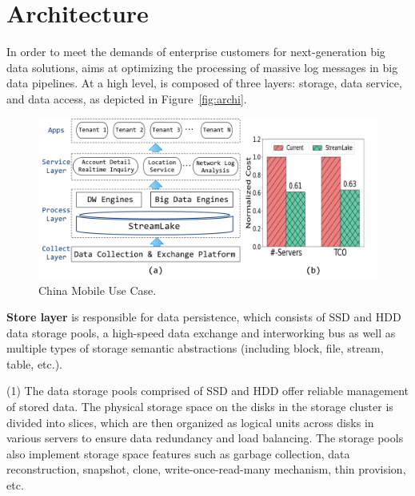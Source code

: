 \section{Architecture} 
\label{sec:archi}


In order to meet the demands of enterprise customers for next-generation big data solutions,  \sys  aims at optimizing the  processing of massive log messages in big data pipelines. At a high level, \sys is composed of three layers: storage, data service, and data access, as depicted in Figure~\ref{fig:archi}.



 
\begin{figure}[!t]
	\centering
	\includegraphics[scale=0.25]{figures/mobile}
	\vspace{-2em}
	\caption{China Mobile Use Case.}
	\label{fig:mobile}
	\vspace{-2em}
\end{figure}

\noindent \textbf{Store layer} is responsible for data persistence, which consists of SSD and HDD data storage pools, a high-speed data exchange and interworking bus as well as multiple types of storage semantic abstractions (including block, file, stream, table, etc.).


(1) The data storage pools comprised of SSD and HDD offer reliable management of stored data. The physical storage space on the disks in the storage cluster is divided into slices, which are then organized as logical units across disks in  various servers to ensure data redundancy and load balancing. The storage pools also implement storage space features such as garbage collection, data reconstruction, snapshot, clone, write-once-read-many mechanism, thin provision, etc. 

